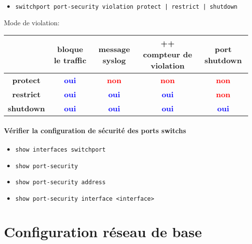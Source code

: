 \documentclass[a4paper]{article}
\begin{document}
\begin{itemize}[label=\textbf{–}]
    \item \texttt{switchport port-security violation {protect | restrict | shutdown}}
\end{itemize}
Mode de violation:
\begin{center}
    \begin{tabular}{|c|c|c|c|c|} \hline
        & \textbf{bloque le traffic} & \textbf{message syslog} & \textbf{++ compteur de violation} & \textbf{port shutdown} \\ \hline
        \textbf{protect}  & \textcolor{blue}{\textbf{oui}} & \textcolor{red}{\textbf{non}} & \textcolor{red}{\textbf{non}} & \textcolor{red}{\textbf{non}} \\
        \textbf{restrict} & \textcolor{blue}{\textbf{oui}} & \textcolor{blue}{\textbf{oui}} & \textcolor{blue}{\textbf{oui}} & \textcolor{red}{\textbf{non}} \\
        \textbf{shutdown} & \textcolor{blue}{\textbf{oui}} & \textcolor{blue}{\textbf{oui}} & \textcolor{blue}{\textbf{oui}} & \textcolor{blue}{\textbf{oui}} \\ \hline
    \end{tabular}
\end{center}





\subsection{Vérifier la configuration de sécurité des ports switchs}



\begin{itemize}[label=\textbf{–}]
    \item \texttt{show interfaces switchport}
    \item \texttt{show port-security}
    \item \texttt{show port-security address}
    \item \texttt{show port-security interface <interface>}
\end{itemize}















\part{Configuration réseau de base}
\end{document}
